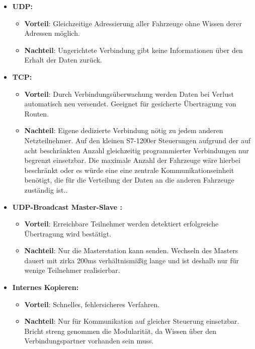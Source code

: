 		\begin{itemize}
			\item \textbf{\ac{UDP}:} 
				\begin{itemize}
					\item \textbf{Vorteil}: Gleichzeitige Adressierung aller Fahrzeuge ohne Wissen derer Adressen möglich.
					\item \textbf{Nachteil}: Ungerichtete Verbindung gibt keine Informationen über den Erhalt der Daten zurück.
				\end{itemize}
			\item \textbf{\acs{TCP}:}
				\begin{itemize}
					\item \textbf{Vorteil}: Durch Verbindungsüberwachung werden Daten bei Verlust automatisch neu versendet. Geeignet für gesicherte Übertragung von Routen.
					\item \textbf{Nachteil}: Eigene dedizierte Verbindung nötig zu jedem anderen Netzteilnehmer. Auf den kleinen S7-1200er Steuerungen aufgrund der auf acht beschränkten Anzahl gleichzeitig programmierter Verbindungen \cite{S7-1200} nur begrenzt einsetzbar. Die maximale Anzahl der Fahrzeuge wäre hierbei beschränkt oder es würde eine eine zentrale Kommunikationseinheit benötigt, die für die Verteilung der Daten an die anderen Fahrzeuge zuständig ist..
				\end{itemize}
			\item \textbf{\ac{UDP}-Broadcast Master-Slave \cite{MasterSlaveUDP}:}
				\begin{itemize}
					\item \textbf{Vorteil}: Erreichbare Teilnehmer werden detektiert erfolgreiche Übertragung wird bestätigt.
					\item \textbf{Nachteil}: Nur die Masterstation kann senden. Wechseln des Masters dauert mit zirka 200ms verhältnismäßig lange und ist deshalb nur für wenige Teilnehmer realisierbar. 
				\end{itemize}
			\item \textbf{Internes Kopieren:}
			\begin{itemize}
				\item \textbf{Vorteil}: Schnelles, fehlersicheres Verfahren.
				\item \textbf{Nachteil}: Nur für Kommunikation auf gleicher Steuerung einsetzbar. Bricht streng genommen die Modularität, da Wissen über den Verbindungspartner vorhanden sein muss.
			\end{itemize}
		\end{itemize}
		
